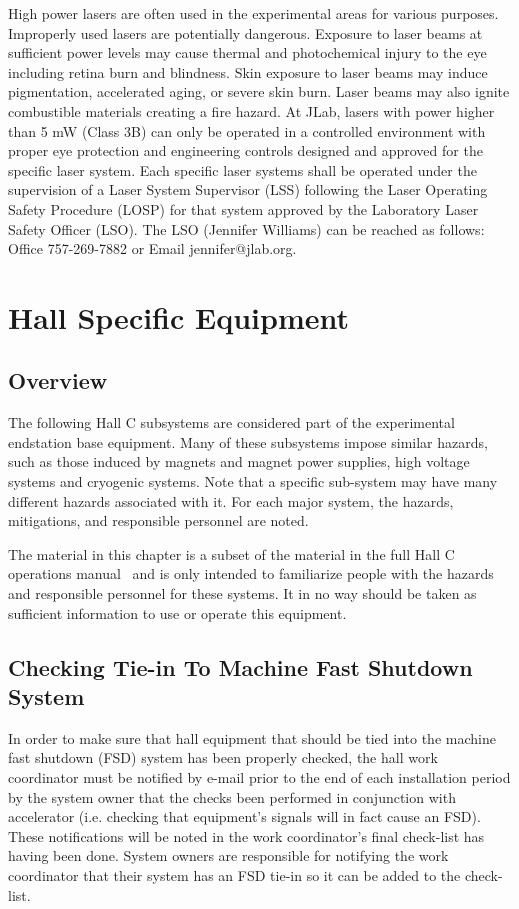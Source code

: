 	High power lasers are often used in the experimental areas for various purposes. Improperly 
used lasers are potentially dangerous. Exposure to laser beams at sufficient power levels 
may cause thermal and photochemical injury to the eye including retina burn and blindness. 
Skin exposure to laser beams may induce pigmentation, accelerated aging, or severe skin burn. 
Laser beams may also ignite combustible materials creating a fire hazard. At JLab, lasers with power 
higher than 5 mW (Class 3B) can only be operated in a controlled environment with proper eye protection 
and engineering controls designed and approved for the specific laser system. Each specific laser systems 
shall be operated under the supervision of a Laser System Supervisor (LSS) following the Laser 
Operating Safety Procedure (LOSP) for that system approved by the Laboratory Laser Safety Officer (LSO). 
The LSO (Jennifer Williams) can be reached as follows: Office 757-269-7882 or Email jennifer@jlab.org.
%
%
\chapter{Hall Specific Equipment}
\label{chap:hallspecificequipment}
\section{Overview}

        The following Hall C subsystems are considered part of the experimental endstation base equipment.
Many of these subsystems impose similar hazards, such as those induced by magnets and magnet power supplies,
high voltage systems and cryogenic systems.  Note that a specific sub-system may have many different hazards associated with it.
For each major system, the hazards, mitigations, and responsible personnel are noted.

The material in this chapter is a subset of the material in the full Hall C operations manual~\cite{HallCosp} and is only intended to familiarize
people with the hazards and responsible personnel for these systems.  It in no way should be taken as sufficient information to
use or operate this equipment.

\section{Checking Tie-in To Machine Fast Shutdown System}

In order to make sure that hall equipment that should be tied into the machine fast shutdown (FSD) system
has been properly checked, the hall work coordinator must be notified by e-mail prior to the end of each
installation period by the system owner
that the checks been performed in conjunction with accelerator (i.e. checking that equipment's signals
will in fact cause an FSD).  These notifications will be
noted in the work coordinator's final check-list has having been done.   System owners are responsible
for notifying the work coordinator that their system has an FSD tie-in so it can be added to the check-list.


%
%


